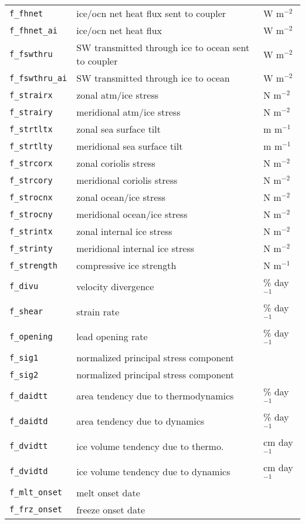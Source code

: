 \begin{center}
\begin{supertabular}{lll}
\texttt{f\_fhnet}   & ice/ocn net heat flux sent to coupler& W m$^{-2}$   \\
\texttt{f\_fhnet\_ai}  & ice/ocn net heat flux            & W m$^{-2}$   \\
\texttt{f\_fswthru} & SW transmitted through ice to ocean sent to coupler & W m$^{-2}$   \\
\texttt{f\_fswthru\_ai} & SW transmitted through ice to ocean  & W m$^{-2}$   \\
\texttt{f\_strairx} & zonal atm/ice stress                 & N m$^{-2}$   \\
\texttt{f\_strairy} & meridional atm/ice stress            & N m$^{-2}$   \\
\texttt{f\_strtltx} & zonal sea surface tilt               & m m$^{-1}$   \\
\texttt{f\_strtlty} & meridional sea surface tilt          & m m$^{-1}$   \\
\texttt{f\_strcorx} & zonal coriolis stress                & N m$^{-2}$   \\
\texttt{f\_strcory} & meridional coriolis stress           & N m$^{-2}$   \\
\texttt{f\_strocnx} & zonal ocean/ice stress               & N m$^{-2}$   \\
\texttt{f\_strocny} & meridional ocean/ice stress          & N m$^{-2}$   \\
\texttt{f\_strintx} & zonal internal ice stress            & N m$^{-2}$   \\
\texttt{f\_strinty} & meridional internal ice stress       & N m$^{-2}$   \\
\texttt{f\_strength}& compressive ice strength             & N m$^{-1}$   \\
\texttt{f\_divu}    & velocity divergence                  & \% day$^{-1}$ \\
\texttt{f\_shear}   & strain rate                          & \% day$^{-1}$ \\
\texttt{f\_opening} & lead opening rate                    & \% day$^{-1}$ \\
\texttt{f\_sig1}    & normalized principal stress component &              \\
\texttt{f\_sig2}    & normalized principal stress component &              \\
\texttt{f\_daidtt}  & area tendency due to thermodynamics  & \% day$^{-1}$  \\
\texttt{f\_daidtd}  & area tendency due to dynamics        & \% day$^{-1}$  \\
\texttt{f\_dvidtt}  & ice volume tendency due to thermo.   & cm day$^{-1}$ \\
\texttt{f\_dvidtd}  & ice volume tendency due to dynamics  & cm day$^{-1}$ \\
\texttt{f\_mlt\_onset}  & melt onset date                   & \\
\texttt{f\_frz\_onset}  & freeze onset date                 & \\
\hline
  \end{supertabular}
  \end{center}

